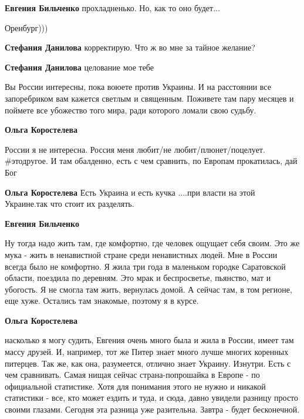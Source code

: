 \begin{itemize}
\begin{itemize}
\textbf{Евгения Бильченко} прохладненько. Но, как то оно будет...
\end{itemize} %

Оренбург)))

\begin{itemize} %
\textbf{Стефания Данилова} корректирую. Что ж во мне за тайное желание?

\textbf{Стефания Данилова} целование мое тебе
\end{itemize} %


Вы России интересны, пока воюете против Украины. И на расстоянии все
запоребриком вам кажется светлым и священным. Поживете там пару месяцев и
поймете все убожество того мира, ради которого ломали свою судьбу.

\begin{itemize} %
\textbf{Ольга Коростелева} 

России я не интересна. Россия меня любит/не любит/плюнет/поцелует. \#этодругое.
И там обалденно, есть с чем сравнить, по Европам прокатилась, дай Бог

\textbf{Ольга Коростелева} Есть Украина и есть кучка ....при власти на этой Украине.так что стоит их разделять.

\textbf{Евгения Бильченко} 

Ну тогда надо жить там, где комфортно, где человек ощущает себя своим. Это же
мука - жить в ненавистной стране среди ненавистных людей. Мне в России всегда
было не комфортно. Я жила три года в маленьком городке Саратовской области,
поездила по деревням. Это мрак и беспросветье, пьянство, мат и убогость. Я не
смогла там жить, вернулась домой. А сейчас там, в том регионе, еще хуже.
Остались там знакомые, поэтому я в курсе.

\textbf{Ольга Коростелева} 

насколько я могу судить, Евгения очень много была и жила в России, имеет там
массу друзей. И, например, тот же Питер знает много лучше многих коренных
питерцев. Так же, как она, разумеется, отлично знает Украину. Изнутри. Есть с
чем сравнивать. Самая нищая сейчас страна-попрошайка в Европе - по официальной
статистике. Хотя для понимания этого не нужно и никакой статистики - все, кто
может ездить и туда, и сюда, давно увидели разницу просто своими глазами.
Сегодня эта разница уже разительна. Завтра - будет бесконечной.


\end{itemize}
\end{itemize}
